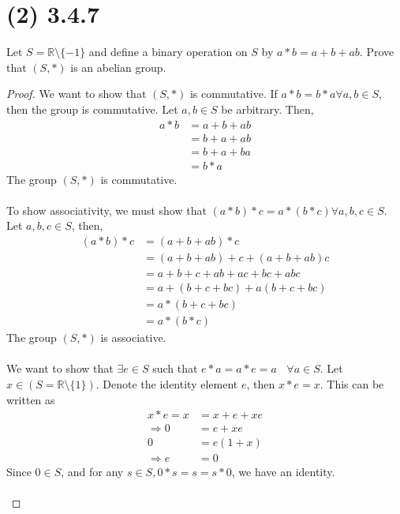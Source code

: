 \documentclass{article}
\begin{document}
\section*{(2) 3.4.7}
Let $S = \mathbb{R} \setminus \{ -1 \} $ and define a binary operation on $S$ by $a*b = a+b+ab$.
Prove that $(S, *)$ is an abelian group.
\begin{proof}
    We want to show that $(S, *)$ is commutative.
    If $a * b = b * a \forall a,b \in S$, then the group is commutative.
    Let $a,b \in S$ be arbitrary.
    Then,
    \begin{align*}
        a * b & = a + b + ab \\
        & = b + a + ab \\
        & = b + a + ba \\
        & = b * a
    \end{align*}
    The group $(S, *)$ is commutative.
    \\\\
    To show associativity, we must show that $(a * b) * c = a * (b * c) \forall a,b,c \in S$.
    Let $a,b,c \in S$, then,
    \begin{align*}
        (a * b) * c & = (a + b + ab) * c \\
        & = (a + b + ab) + c + (a + b + ab)c \\
        & = a + b + c + ab + ac + bc + abc \\
        & = a + (b + c + bc) + a(b + c + bc) \\
        & = a * (b + c + bc) \\
        & = a * (b * c)
    \end{align*}
    The group $(S, *)$ is associative.
    \\\\
    We want to show that $\exists e \in S$ such that $e * a = a * e = a \ \ \ \ \forall a \in S$.
    Let $x \in (S = \mathbb{R} \setminus \{ 1 \})$.
    Denote the identity element $e$, then $x * e = x$.
    This can be written as
    \begin{align*}
        x * e = x & = x + e + xe \\
        \Longrightarrow 0 & = e + xe \\
        0 & = e(1 + x) \\
        \Longrightarrow e & = 0
    \end{align*}
    Since $0 \in S$, and for any $s \in S, 0 * s = s = s * 0$, we have an identity.
    \\\\

\end{proof}
\end{document}
